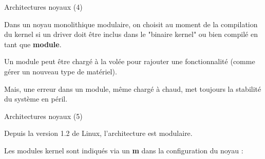 \documentclass[12pt, t]{beamer}
\begin{document}
\begin{frame}{Architectures noyaux (4)}

    \vspace{15pt}
    Dans un noyau monolithique modulaire, on choisit au moment de la compilation
    du kernel si un driver doit être inclus dans le "binaire kernel" ou
    bien compilé en tant que {\textbf{module}}.

    {
        \vspace{15pt}
        Un module peut être chargé à la volée pour rajouter une fonctionnalité
        (comme gérer un nouveau type de matériel).
    }

    {
        \vspace{15pt}
        Mais, une erreur dans un module, même chargé à chaud, met toujours la
        stabilité du système en péril.
    }

\end{frame}


\begin{frame}{Architectures noyaux (5)}

    \vspace{10pt}
    Depuis la version 1.2 de Linux, l'architecture est modulaire.

    {
        \vspace{10pt}
        Les modules kernel sont indiqués via un {\textbf{m}} dans la configuration
        du noyau :

        \vspace{8pt}
        \lstconf
    }

\end{frame}
\end{document}
